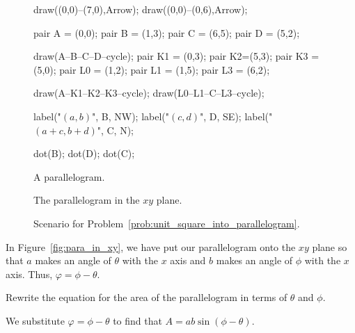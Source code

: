 \documentclass[../key.tex]{subfiles}
\begin{document}
\begin{figure}[h]
\begin{center}
\begin{minipage}[b]{0.3\textwidth}
\begin{asy}[width=\textwidth]
				draw((0,0)--(7,0),Arrow);
				draw((0,0)--(0,6),Arrow);

				pair A = (0,0);
				pair B = (1,3);
				pair C = (6,5);
				pair D = (5,2);

				draw(A--B--C--D--cycle);
				pair K1 = (0,3);
				pair K2=(5,3);
				pair K3 = (5,0);
				pair L0 = (1,2);
				pair L1 = (1,5);
				pair L3 = (6,2);

				draw(A--K1--K2--K3--cycle);
				draw(L0--L1--C--L3--cycle);

				label("$(a,b)$", B, NW);
				label("$(c,d)$", D, SE);
				label("$(a+c,b+d)$", C, N);

				dot(B);
				dot(D);
				dot(C);

			\end{asy}
		\end{minipage}
	\end{center}
	\vspace*{-2\baselineskip}
	\begin{center}
		\begin{minipage}[t]{0.3\textwidth}
			\caption{A parallelogram.}
			\label{fig:parallelogram_generic}
		\end{minipage}
		\hfill
		\begin{minipage}[t]{0.3\textwidth}
			\caption{The parallelogram in the $xy$ plane.}
			\label{fig:para_in_xy}
		\end{minipage}
		\hfill
		\begin{minipage}[t]{0.3\textwidth}
			\caption{Scenario for Problem~\ref{prob:unit_square_into_parallelogram}.}
			\label{fig:para_scenario}
		\end{minipage}
	\end{center}
\end{figure}


\begin{outer_problem}
\item In Figure~\ref{fig:para_in_xy}, we have put our parallelogram onto the $xy$ plane so that $a$ makes an angle of $\theta$ with the $x$ axis and $b$ makes an angle of $\phi$ with the $x$ axis. Thus, $\varphi=\phi-\theta$.
\end{outer_problem}

\begin{inner_problem}[start=1]
\item Rewrite the equation for the area of the parallelogram in terms of $\theta$ and $\phi$.
\end{inner_problem}

We substitute $\varphi = \phi - \theta$ to find that $A = ab\sin(\phi - \theta)$.
\end{document}
